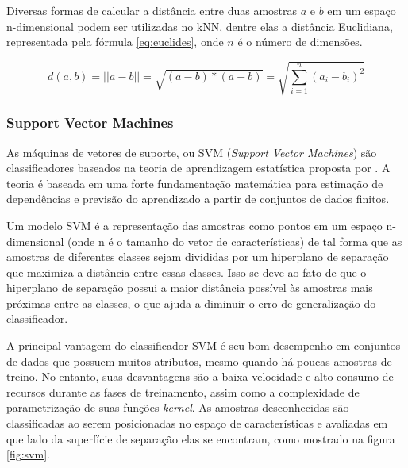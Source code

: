 Diversas formas de calcular a distância entre duas amostras $a$ e $b$ em um espaço n-dimensional podem ser utilizadas no kNN, dentre elas a distância Euclidiana, representada pela fórmula \ref{eq:euclides}, onde $n$ é o número de dimensões.

\begin{equation}
	\displaystyle d(a,b) = ||a - b|| = \sqrt{(a - b)*(a -b)} =
	\displaystyle \sqrt{\sum_{i=1}^{n}(a_i - b_i)^2}
\label{eq:euclides}
\end{equation}

\subsubsection*{Support Vector Machines}

As máquinas de vetores de suporte, ou SVM (\textit{Support Vector Machines}) são classificadores baseados na teoria de aprendizagem estatística proposta por \cite{vapnik:1995}. A teoria é baseada em uma forte fundamentação matemática para estimação de dependências e previsão do aprendizado a partir de conjuntos de dados finitos. 

Um modelo SVM é a representação das amostras como pontos em um espaço n-dimensional (onde n é o tamanho do vetor de características) de tal forma que as amostras de diferentes classes sejam divididas por um hiperplano de separação que maximiza a distância entre essas classes. Isso se deve ao fato de que o hiperplano de separação possui a maior distância possível às amostras mais próximas entre as classes, o que ajuda a diminuir o erro de generalização do classificador.

A principal vantagem do classificador SVM é seu bom desempenho em conjuntos de dados que possuem muitos atributos, mesmo quando há poucas amostras de treino. No entanto, suas desvantagens são a baixa velocidade e alto consumo de recursos durante as fases de treinamento, assim como a complexidade de parametrização de suas funções \textit{kernel}. As amostras desconhecidas são classificadas ao serem posicionadas no espaço de características e avaliadas em que lado da superfície de separação elas se encontram, como mostrado na figura \ref{fig:svm}.

